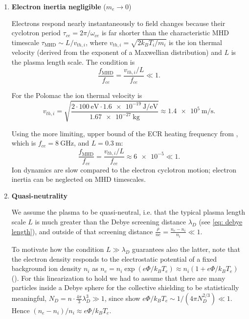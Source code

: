 \begin{enumerate}

\item \textbf{Electron inertia negligible} ($m_e \to 0$)

Electrons respond nearly instantaneously to field changes because their
cyclotron period $\tau_{ce}=2\pi/\omega_{ce}$ is far shorter than the
characteristic MHD timescale $\tau_\text{MHD}\sim L/v_{th, i}$, where
$v_{th, i}=\sqrt{2k_BT_i/m_i}$ is the ion thermal velocity 
(derived from the exponent of a Maxwellian distribution)
and $L$ is the plasma length scale.  The condition is
\[
    \frac{f_\text{MHD}}{f_{ce}}
    = \frac{v_{th, i}/L}{f_{ce}} \ll 1.
\]


For the Polomac the ion thermal velocity is
\[
    v_{th,i}
    = \sqrt{\frac{2 \cdot \SI{100}{\electronvolt} \cdot \SI{1.6e-19}{\joule\per\electronvolt}}
                 {\SI{1.67e-27}{\kilogram}}}
    \approx \SI{1.4e5}{\metre\per\second}.
\]

Using the more limiting, upper bound of the ECR heating frequency from \cite{Elio2024}, 
which is $f_{ce}=\SI{8}{\giga\hertz}$, and $L = \SI{0.3}{\metre}$:
\[
    \frac{f_\text{MHD}}{f_{ce}}
    = \frac{v_{th,i}/L}{f_{ce}}
    \approx \num{6e-5} \ll 1.
\]
Ion dynamics are slow compared to the electron cyclotron motion;
electron inertia can be neglected on MHD timescales.




\item \textbf{Quasi-neutrality}

We assume the plasma to be quasi-neutral, i.e. that the typical plasma length scale $L$
is much greater than the Debye screening distance $\lambda_D$ (see \eqref{eq: debye length}), 
and outside of that screening distance $\frac{\rho}{ne} = \frac{n_e - n_i}{n_i} \ll 1$.



To motivate how the condition $L \gg \lambda_D$ 
guarantees also the latter, note that the electron density responds to the electrostatic 
potential of a fixed background ion density $n_{i}$ as 
$n_e = n_{i}\exp(e\Phi/k_B T_e) \approx n_{i}(1 + e\Phi/k_B T_e)$ (\cite{epfl_plasma_intro}).
For this linearization to hold we had to assume that there are many particles 
inside a Debye sphere for the collective shielding to be statistically meaningful,
$N_D = n \cdot \frac{4\pi}{3}\lambda_D^3 \gg 1$, since
\cite{epfl_plasma_intro} show $e\Phi/k_B T_e \sim 1/(4\pi N_D^{2/3}) \ll 1$.
Hence $(n_e - n_i)/n_i \approx e\Phi/k_B T_e$.


\end{enumerate}
